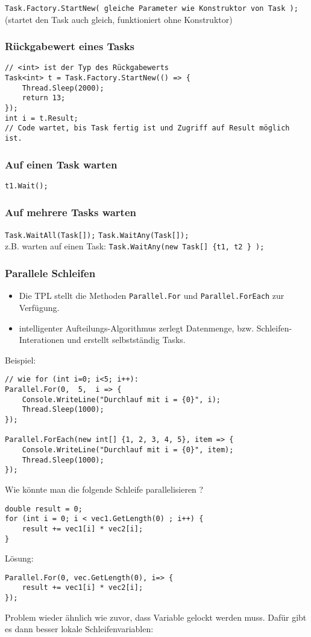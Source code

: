 \lstinline`Task.Factory.StartNew( gleiche Parameter wie Konstruktor von Task ); `\\
(startet den Task auch gleich, funktioniert ohne Konstruktor)

\subsubsection{Rückgabewert eines Tasks}

\begin{lstlisting}[language={[Sharp]C}]
// <int> ist der Typ des Rückgabewerts
Task<int> t = Task.Factory.StartNew(() => {
	Thread.Sleep(2000); 
	return 13; 
}); 
int i = t.Result;
// Code wartet, bis Task fertig ist und Zugriff auf Result möglich ist.
\end{lstlisting}

\subsubsection{Auf einen Task warten}
\lstinline`t1.Wait();`

\subsubsection{Auf mehrere Tasks warten}
\lstinline`Task.WaitAll(Task[]);` \lstinline`Task.WaitAny(Task[]);`\\
z.B. warten auf einen Task: \lstinline`Task.WaitAny(new Task[] {t1, t2 } );`

\subsubsection{Parallele Schleifen}

\begin{itemize}
\item Die TPL stellt die Methoden \lstinline`Parallel.For` und \lstinline`Parallel.ForEach` zur Verfügung.
\item intelligenter Aufteilungs-Algorithmus zerlegt Datenmenge, bzw. Schleifen-Interationen und erstellt selbstständig Tasks.
\end{itemize}
Beispiel:
\begin{lstlisting}[language={[Sharp]C}]
// wie for (int i=0; i<5; i++):
Parallel.For(0,  5,  i => {
	Console.WriteLine("Durchlauf mit i = {0}", i);
	Thread.Sleep(1000);
});

Parallel.ForEach(new int[] {1, 2, 3, 4, 5}, item => {
	Console.WriteLine("Durchlauf mit i = {0}", item);
	Thread.Sleep(1000);
});
\end{lstlisting}
Wie könnte man die folgende Schleife parallelisieren ? 
\begin{lstlisting}[language={[Sharp]C}]
double result = 0;
for (int i = 0; i < vec1.GetLength(0) ; i++) {
	result += vec1[i] * vec2[i];
}
\end{lstlisting}
Lösung:
\begin{lstlisting}[language={[Sharp]C}]
Parallel.For(0, vec.GetLength(0), i=> {
	result += vec1[i] * vec2[i];
});
\end{lstlisting}
Problem wieder ähnlich wie zuvor, dass Variable gelockt werden muss. Dafür gibt es dann besser lokale Schleifenvariablen: 
